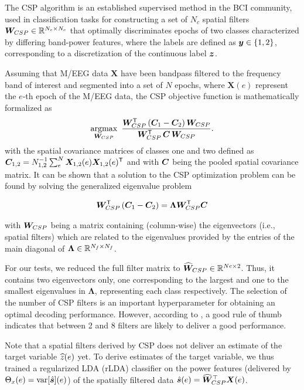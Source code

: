 \documentclass[10pt,a4paper, twocolumn]{article}
\providecommand{\mat}[1]{{\bm {#1}}}
\begin{document}
The CSP algorithm is an established supervised method in the BCI community, used in classification tasks for constructing a set of $N_c$ spatial filters $\mat{W}_{CSP} \in \Real^{N_c \times N_c}$ that optimally discriminates epochs of two classes characterized by differing band-power features, where the labels are defined as ${\bm {y}} \in \lbrace 1,2 \rbrace$, corresponding to a discretization of the continuous label ${\bm {z}}$.

Assuming that M/EEG data $\mat{X}$ have been bandpass filtered to the frequency band of interest and segmented into a set of $N$ epochs, where $\mat{X}(e)$ represent the $e$-th epoch of the M/EEG data, the CSP objective function is mathematically formalized as
\begin{align}
\underset{{\bm {W}}_{CSP}}{\operatorname{argmax}} \, \, \, \frac{ {\bm {W}}_{CSP}^{\textsf{T}} \left( {\bm {C}}_1 -  {\bm {C}}_2\right){\bm {W}}_{CSP}}{{\bm {W}}_{CSP}^{\textsf{T}}\, {\bm {C}} \, {\bm {W}}_{CSP}}.
\end{align}
with the spatial covariance matrices of classes one and two defined as $\mat{C}_{1,2} = N^{-1}_{1,2}\sum_e^N\mat{X}_{1,2}(e)\mat{X}_{1,2}(e)^\T$ and with ${\bm {C}}$ being the pooled spatial covariance matrix. It can be shown that a solution to the CSP optimization problem can be found by solving the  generalized eigenvalue problem 

\begin{align}\label{eq:eig_csp}
\mat{W}_{CSP}^\T\left(\mat{C}_1 - \mat{C}_2\right) = \mat{\Lambda} \mat{W}_{CSP}^\T\mat{C}
\end{align}

with ${\bm {W}}_{CSP}$ being a matrix containing (column-wise) the eigenvectors (i.e., spatial filters) which are related to the eigenvalues provided by the entries of the main diagonal of $\mat{\Lambda} \in \Real^{N_f \times N_f}$.

For our tests, we reduced the full filter matrix to $\est{\mat{W}}_{CSP}\in \Real^{Nc \times 2}$. Thus, it contains two eigenvectors only, one corresponding to the largest and one to the smallest eigenvalues in $\mat{\Lambda}$, representing each class respectively. The selection of the number of CSP filters is an important hyperparameter for obtaining an optimal decoding performance. However, according to \cite{blankertz2011single}, a good rule of thumb indicates that between 2 and 8 filters are likely to deliver a good performance.

Note that a spatial filters derived by CSP does not deliver an estimate of the target variable ${\widehat{z}}(e)$ yet. To derive estimates of the target variable, we thus trained a regularized LDA (rLDA) classifier on the power features (delivered by $\Theta_x(e) = \operatorname{var}[\hat{{\bm {s}}}](e)$) of the spatially filtered data $\hat{\ve{s}}(e)=\est{\mat{W}}_{CSP}^\top\mat{X}(e)$\cite{blankertz2011single}.
\end{document}

